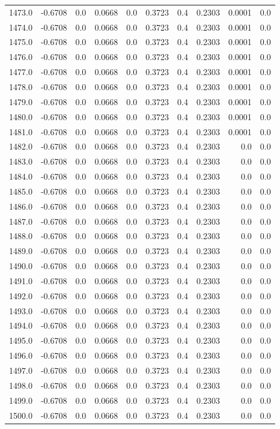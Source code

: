 \begin{longtable}{lrrrrrrrrr}
1473.0 & -0.6708 & 0.0 & 0.0668 & 0.0 & 0.3723 & 0.4 & 0.2303 & 0.0001 & 0.0 \\
1474.0 & -0.6708 & 0.0 & 0.0668 & 0.0 & 0.3723 & 0.4 & 0.2303 & 0.0001 & 0.0 \\
1475.0 & -0.6708 & 0.0 & 0.0668 & 0.0 & 0.3723 & 0.4 & 0.2303 & 0.0001 & 0.0 \\
1476.0 & -0.6708 & 0.0 & 0.0668 & 0.0 & 0.3723 & 0.4 & 0.2303 & 0.0001 & 0.0 \\
1477.0 & -0.6708 & 0.0 & 0.0668 & 0.0 & 0.3723 & 0.4 & 0.2303 & 0.0001 & 0.0 \\
1478.0 & -0.6708 & 0.0 & 0.0668 & 0.0 & 0.3723 & 0.4 & 0.2303 & 0.0001 & 0.0 \\
1479.0 & -0.6708 & 0.0 & 0.0668 & 0.0 & 0.3723 & 0.4 & 0.2303 & 0.0001 & 0.0 \\
1480.0 & -0.6708 & 0.0 & 0.0668 & 0.0 & 0.3723 & 0.4 & 0.2303 & 0.0001 & 0.0 \\
1481.0 & -0.6708 & 0.0 & 0.0668 & 0.0 & 0.3723 & 0.4 & 0.2303 & 0.0001 & 0.0 \\
1482.0 & -0.6708 & 0.0 & 0.0668 & 0.0 & 0.3723 & 0.4 & 0.2303 & 0.0 & 0.0 \\
1483.0 & -0.6708 & 0.0 & 0.0668 & 0.0 & 0.3723 & 0.4 & 0.2303 & 0.0 & 0.0 \\
1484.0 & -0.6708 & 0.0 & 0.0668 & 0.0 & 0.3723 & 0.4 & 0.2303 & 0.0 & 0.0 \\
1485.0 & -0.6708 & 0.0 & 0.0668 & 0.0 & 0.3723 & 0.4 & 0.2303 & 0.0 & 0.0 \\
1486.0 & -0.6708 & 0.0 & 0.0668 & 0.0 & 0.3723 & 0.4 & 0.2303 & 0.0 & 0.0 \\
1487.0 & -0.6708 & 0.0 & 0.0668 & 0.0 & 0.3723 & 0.4 & 0.2303 & 0.0 & 0.0 \\
1488.0 & -0.6708 & 0.0 & 0.0668 & 0.0 & 0.3723 & 0.4 & 0.2303 & 0.0 & 0.0 \\
1489.0 & -0.6708 & 0.0 & 0.0668 & 0.0 & 0.3723 & 0.4 & 0.2303 & 0.0 & 0.0 \\
1490.0 & -0.6708 & 0.0 & 0.0668 & 0.0 & 0.3723 & 0.4 & 0.2303 & 0.0 & 0.0 \\
1491.0 & -0.6708 & 0.0 & 0.0668 & 0.0 & 0.3723 & 0.4 & 0.2303 & 0.0 & 0.0 \\
1492.0 & -0.6708 & 0.0 & 0.0668 & 0.0 & 0.3723 & 0.4 & 0.2303 & 0.0 & 0.0 \\
1493.0 & -0.6708 & 0.0 & 0.0668 & 0.0 & 0.3723 & 0.4 & 0.2303 & 0.0 & 0.0 \\
1494.0 & -0.6708 & 0.0 & 0.0668 & 0.0 & 0.3723 & 0.4 & 0.2303 & 0.0 & 0.0 \\
1495.0 & -0.6708 & 0.0 & 0.0668 & 0.0 & 0.3723 & 0.4 & 0.2303 & 0.0 & 0.0 \\
1496.0 & -0.6708 & 0.0 & 0.0668 & 0.0 & 0.3723 & 0.4 & 0.2303 & 0.0 & 0.0 \\
1497.0 & -0.6708 & 0.0 & 0.0668 & 0.0 & 0.3723 & 0.4 & 0.2303 & 0.0 & 0.0 \\
1498.0 & -0.6708 & 0.0 & 0.0668 & 0.0 & 0.3723 & 0.4 & 0.2303 & 0.0 & 0.0 \\
1499.0 & -0.6708 & 0.0 & 0.0668 & 0.0 & 0.3723 & 0.4 & 0.2303 & 0.0 & 0.0 \\
1500.0 & -0.6708 & 0.0 & 0.0668 & 0.0 & 0.3723 & 0.4 & 0.2303 & 0.0 & 0.0 \\
\end{longtable}